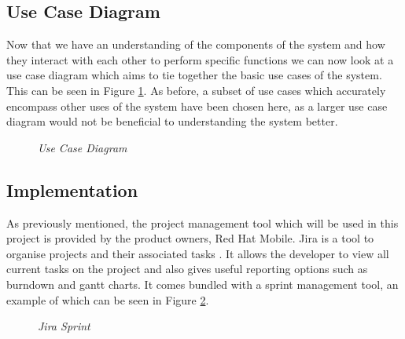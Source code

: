 \subsection{Use Case Diagram}

Now that we have an understanding of the components of the system and how they interact with each other to perform specific functions we can now look at a use case diagram which aims to tie together the basic use cases of the system. This can be seen in Figure \ref{fig:use_case_diagram}. As before, a subset of use cases which accurately encompass other uses of the system have been chosen here, as a larger use case diagram would not be beneficial to understanding the system better. 

\begin{figure}[!ht]
\centering
{}
\caption{\em Use Case Diagram}
\label{fig:use_case_diagram}
\end{figure}

\newpage
\subsection{Implementation}
As previously mentioned, the project management tool which will be used in this project is provided by the product owners, Red Hat Mobile. Jira is a tool to organise projects and their associated tasks \citep{JBoss2016}. It allows the developer to view all current tasks on the project and also gives useful reporting options such as burndown and gantt charts. It comes bundled with a sprint management tool, an example of which can be seen in Figure \ref{fig:jira}.

\begin{figure}[!ht]
\centering
{}
\caption{\em Jira Sprint}
\label{fig:jira}
\end{figure}

